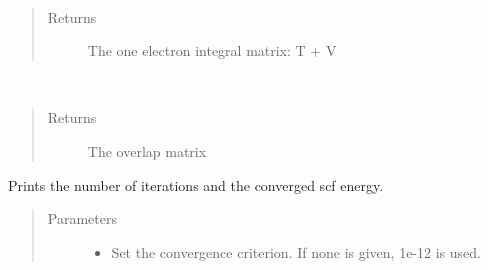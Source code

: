 \documentclass[letterpaper,10pt,english]{sphinxmanual}
\begin{document}
\begin{fulllineitems}
\begin{fulllineitems}
\begin{quote}
\begin{description}
\end{description}\end{quote}

\end{fulllineitems}


\begin{fulllineitems}
\label{\detokenize{RHF:hf.RHF.RHF.get_one_e}}~\begin{quote}\begin{description}
\item[{Returns}] \leavevmode
The one electron integral matrix: T + V

\end{description}\end{quote}

\end{fulllineitems}


\begin{fulllineitems}
\label{\detokenize{RHF:hf.RHF.RHF.get_ovlp}}~\begin{quote}\begin{description}
\item[{Returns}] \leavevmode
The overlap matrix

\end{description}\end{quote}

\end{fulllineitems}


\begin{fulllineitems}
\label{\detokenize{RHF:hf.RHF.RHF.get_scf_solution}}
Prints the number of iterations and the converged scf energy.
\begin{quote}\begin{description}
\item[{Parameters}] \leavevmode\begin{itemize}
\item {} 
 \textendash{} Set the convergence criterion. If none is given, 1e-12 is used.


\end{itemize}
\end{description}
\end{quote}
\end{fulllineitems}
\end{fulllineitems}
\end{document}
